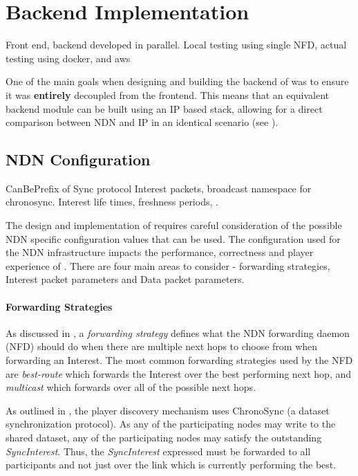 \chapter{Backend Implementation}
Front end, backend developed in parallel. Local testing using single NFD, actual testing using docker, and aws

One of the main goals when designing and building the backend of \game{} was to ensure it was \textbf{entirely} decoupled from the frontend. This means that an equivalent backend module can be built using an IP based stack, allowing for a direct comparison between NDN and IP in an identical scenario (see ).

\section{NDN Configuration}
CanBePrefix of Sync protocol Interest packets, broadcast namespace for chronosync. Interest life times, freshness periods, .

The design and implementation of \game{} requires careful consideration of the possible NDN specific configuration values that can be used. The configuration used for the NDN infrastructure impacts the performance, correctness and player experience of \game{}. There are four main areas to consider - forwarding strategies, Interest packet parameters and Data packet parameters.

\subsubsection{Forwarding Strategies}
As discussed in , a \textit{forwarding strategy} defines what the NDN forwarding daemon (NFD) should do when there are multiple next hops to choose from when forwarding an Interest. The most common forwarding strategies used by the NFD are \textit{best-route} which forwards the Interest over the best performing next hop, and \textit{multicast} which forwards over all of the possible next hops. 

As outlined in , the player discovery mechanism uses ChronoSync (a dataset synchronization protocol). As any of the participating nodes may write to the shared dataset, any of the participating nodes may satisfy the outstanding \textit{SyncInterest}. Thus, the \textit{SyncInterest} expressed must be forwarded to all participants and not just over the link which is currently performing the best.


